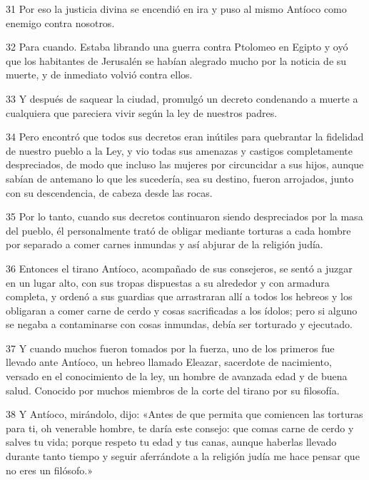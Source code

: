 \par 31 Por eso la justicia divina se encendió en ira y puso al mismo Antíoco como enemigo contra nosotros.

\par 32 Para cuando. Estaba librando una guerra contra Ptolomeo en Egipto y oyó que los habitantes de Jerusalén se habían alegrado mucho por la noticia de su muerte, y de inmediato volvió contra ellos.

\par 33 Y después de saquear la ciudad, promulgó un decreto condenando a muerte a cualquiera que pareciera vivir según la ley de nuestros padres.

\par 34 Pero encontró que todos sus decretos eran inútiles para quebrantar la fidelidad de nuestro pueblo a la Ley, y vio todas sus amenazas y castigos completamente despreciados, de modo que incluso las mujeres por circuncidar a sus hijos, aunque sabían de antemano lo que les sucedería, sea ​​su destino, fueron arrojados, junto con su descendencia, de cabeza desde las rocas.

\par 35 Por lo tanto, cuando sus decretos continuaron siendo despreciados por la masa del pueblo, él personalmente trató de obligar mediante torturas a cada hombre por separado a comer carnes inmundas y así abjurar de la religión judía.

\par 36 Entonces el tirano Antíoco, acompañado de sus consejeros, se sentó a juzgar en un lugar alto, con sus tropas dispuestas a su alrededor y con armadura completa, y ordenó a sus guardias que arrastraran allí a todos los hebreos y los obligaran a comer carne de cerdo y cosas sacrificadas a los ídolos; pero si alguno se negaba a contaminarse con cosas inmundas, debía ser torturado y ejecutado.

\par 37 Y cuando muchos fueron tomados por la fuerza, uno de los primeros fue llevado ante Antíoco, un hebreo llamado Eleazar, sacerdote de nacimiento, versado en el conocimiento de la ley, un hombre de avanzada edad y de buena salud. Conocido por muchos miembros de la corte del tirano por su filosofía.

\par 38 Y Antíoco, mirándolo, dijo: «Antes de que permita que comiencen las torturas para ti, oh venerable hombre, te daría este consejo: que comas carne de cerdo y salves tu vida; porque respeto tu edad y tus canas, aunque haberlas llevado durante tanto tiempo y seguir aferrándote a la religión judía me hace pensar que no eres un filósofo.»

